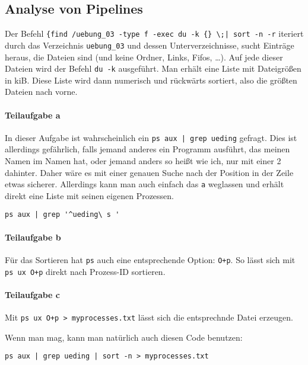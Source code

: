 \documentclass[12pt]{article}
\begin{document}



\subsection{Analyse von Pipelines}

Der Befehl \verb#{find /uebung_03 -type f -exec du -k {} \;| sort -n -r# iteriert durch das Verzeichnis \verb#uebung_03# und dessen Unterverzeichnisse, sucht Einträge heraus, die Dateien sind (und keine Ordner, Links, Fifos, …). Auf jede dieser Dateien wird der Befehl \texttt{du -k} ausgeführt. Man erhält eine Liste mit Dateigrößen in kiB. Diese Liste wird dann numerisch und rückwärts sortiert, also die größten Dateien nach vorne.

\paragraph{Teilaufgabe a}
In dieser Aufgabe ist wahrscheinlich ein \verb#ps aux | grep ueding# gefragt. Dies ist allerdings gefährlich, falls jemand anderes ein Programm ausführt, das meinen Namen im Namen hat, oder jemand anders so heißt wie ich, nur mit einer 2 dahinter. Daher wäre es mit einer genauen Suche nach der Position in der Zeile etwas sicherer. Allerdings kann man auch einfach das \texttt{a} weglassen und erhält direkt eine Liste mit seinen eigenen Prozessen.

\begin{lstlisting}[caption=Einschänkung des Suchbereichs]
ps aux | grep '^ueding\ s '
\end{lstlisting}

\paragraph{Teilaufgabe b}
Für das Sortieren hat \texttt{ps} auch eine entsprechende Option: \texttt{O+p}. So lässt sich mit \texttt{ps ux O+p} direkt nach Prozess-ID sortieren.

\paragraph{Teilaufgabe c}
Mit \verb#ps ux O+p > myprocesses.txt# lässt sich die entsprechnde Datei erzeugen.  


Wenn man mag, kann man natürlich auch diesen Code benutzen:
\begin{lstlisting}[caption=verkettete Pipes]
ps aux | grep ueding | sort -n > myprocesses.txt
\end{lstlisting}
\end{document}
